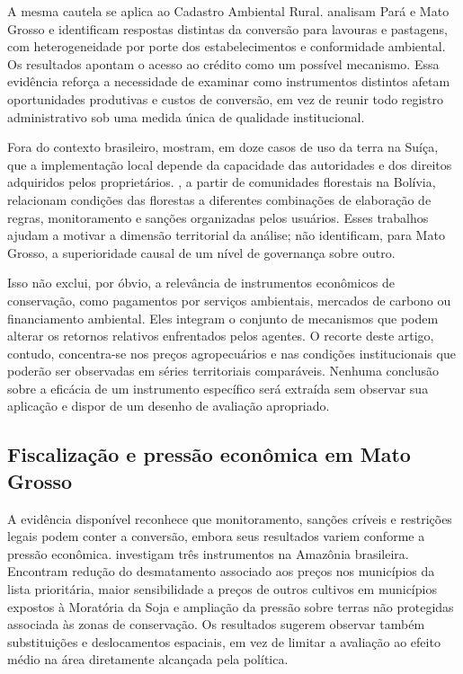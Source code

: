 A mesma cautela se aplica ao Cadastro Ambiental Rural.  analisam Pará e Mato Grosso e identificam respostas distintas da conversão para lavouras e pastagens, com heterogeneidade por porte dos estabelecimentos e conformidade ambiental. Os resultados apontam o acesso ao crédito como um possível mecanismo. Essa evidência reforça a necessidade de examinar como instrumentos distintos afetam oportunidades produtivas e custos de conversão, em vez de reunir todo registro administrativo sob uma medida única de qualidade institucional.

Fora do contexto brasileiro,  mostram, em doze casos de uso da terra na Suíça, que a implementação local depende da capacidade das autoridades e dos direitos adquiridos pelos proprietários. , a partir de comunidades florestais na Bolívia, relacionam condições das florestas a diferentes combinações de elaboração de regras, monitoramento e sanções organizadas pelos usuários. Esses trabalhos ajudam a motivar a dimensão territorial da análise; não identificam, para Mato Grosso, a superioridade causal de um nível de governança sobre outro.

Isso não exclui, por óbvio, a relevância de instrumentos econômicos de conservação, como pagamentos por serviços ambientais, mercados de carbono ou financiamento ambiental. Eles integram o conjunto de mecanismos que podem alterar os retornos relativos enfrentados pelos agentes. O recorte deste artigo, contudo, concentra-se nos preços agropecuários e nas condições institucionais que poderão ser observadas em séries territoriais comparáveis. Nenhuma conclusão sobre a eficácia de um instrumento específico será extraída sem observar sua aplicação e dispor de um desenho de avaliação apropriado.

\subsection{Fiscalização e pressão econômica em Mato Grosso}

A evidência disponível reconhece que monitoramento, sanções críveis e restrições legais podem conter a conversão, embora seus resultados variem conforme a pressão econômica.  investigam três instrumentos na Amazônia brasileira. Encontram redução do desmatamento associado aos preços nos municípios da lista prioritária, maior sensibilidade a preços de outros cultivos em municípios expostos à Moratória da Soja e ampliação da pressão sobre terras não protegidas associada às zonas de conservação. Os resultados sugerem observar também substituições e deslocamentos espaciais, em vez de limitar a avaliação ao efeito médio na área diretamente alcançada pela política.

